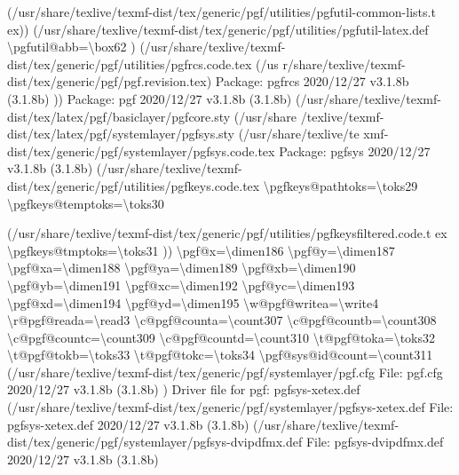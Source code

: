 \documentclass[
  letterpaper,
  DIV=11,
  numbers=noendperiod]{scrartcl}
\newenvironment{Shaded}{\begin{snugshade}}{\end{snugshade}}
\newcommand{\NormalTok}[1]{\textcolor[rgb]{0.00,0.23,0.31}{#1}}
\begin{document}
\begin{Shaded}
\begin{Highlighting}[]
\NormalTok{(/usr/share/texlive/texmf{-}dist/tex/generic/pgf/utilities/pgfutil{-}common{-}lists.t}
\NormalTok{ex)) (/usr/share/texlive/texmf{-}dist/tex/generic/pgf/utilities/pgfutil{-}latex.def}
\NormalTok{\textbackslash{}pgfutil@abb=\textbackslash{}box62}
\NormalTok{) (/usr/share/texlive/texmf{-}dist/tex/generic/pgf/utilities/pgfrcs.code.tex (/us}
\NormalTok{r/share/texlive/texmf{-}dist/tex/generic/pgf/pgf.revision.tex)}
\NormalTok{Package: pgfrcs 2020/12/27 v3.1.8b (3.1.8b)}
\NormalTok{))}
\NormalTok{Package: pgf 2020/12/27 v3.1.8b (3.1.8b)}
\NormalTok{(/usr/share/texlive/texmf{-}dist/tex/latex/pgf/basiclayer/pgfcore.sty (/usr/share}
\NormalTok{/texlive/texmf{-}dist/tex/latex/pgf/systemlayer/pgfsys.sty (/usr/share/texlive/te}
\NormalTok{xmf{-}dist/tex/generic/pgf/systemlayer/pgfsys.code.tex}
\NormalTok{Package: pgfsys 2020/12/27 v3.1.8b (3.1.8b)}
\NormalTok{(/usr/share/texlive/texmf{-}dist/tex/generic/pgf/utilities/pgfkeys.code.tex}
\NormalTok{\textbackslash{}pgfkeys@pathtoks=\textbackslash{}toks29}
\NormalTok{\textbackslash{}pgfkeys@temptoks=\textbackslash{}toks30}

\NormalTok{(/usr/share/texlive/texmf{-}dist/tex/generic/pgf/utilities/pgfkeysfiltered.code.t}
\NormalTok{ex}
\NormalTok{\textbackslash{}pgfkeys@tmptoks=\textbackslash{}toks31}
\NormalTok{))}
\NormalTok{\textbackslash{}pgf@x=\textbackslash{}dimen186}
\NormalTok{\textbackslash{}pgf@y=\textbackslash{}dimen187}
\NormalTok{\textbackslash{}pgf@xa=\textbackslash{}dimen188}
\NormalTok{\textbackslash{}pgf@ya=\textbackslash{}dimen189}
\NormalTok{\textbackslash{}pgf@xb=\textbackslash{}dimen190}
\NormalTok{\textbackslash{}pgf@yb=\textbackslash{}dimen191}
\NormalTok{\textbackslash{}pgf@xc=\textbackslash{}dimen192}
\NormalTok{\textbackslash{}pgf@yc=\textbackslash{}dimen193}
\NormalTok{\textbackslash{}pgf@xd=\textbackslash{}dimen194}
\NormalTok{\textbackslash{}pgf@yd=\textbackslash{}dimen195}
\NormalTok{\textbackslash{}w@pgf@writea=\textbackslash{}write4}
\NormalTok{\textbackslash{}r@pgf@reada=\textbackslash{}read3}
\NormalTok{\textbackslash{}c@pgf@counta=\textbackslash{}count307}
\NormalTok{\textbackslash{}c@pgf@countb=\textbackslash{}count308}
\NormalTok{\textbackslash{}c@pgf@countc=\textbackslash{}count309}
\NormalTok{\textbackslash{}c@pgf@countd=\textbackslash{}count310}
\NormalTok{\textbackslash{}t@pgf@toka=\textbackslash{}toks32}
\NormalTok{\textbackslash{}t@pgf@tokb=\textbackslash{}toks33}
\NormalTok{\textbackslash{}t@pgf@tokc=\textbackslash{}toks34}
\NormalTok{\textbackslash{}pgf@sys@id@count=\textbackslash{}count311}
\NormalTok{(/usr/share/texlive/texmf{-}dist/tex/generic/pgf/systemlayer/pgf.cfg}
\NormalTok{File: pgf.cfg 2020/12/27 v3.1.8b (3.1.8b)}
\NormalTok{)}
\NormalTok{Driver file for pgf: pgfsys{-}xetex.def}
\NormalTok{(/usr/share/texlive/texmf{-}dist/tex/generic/pgf/systemlayer/pgfsys{-}xetex.def}
\NormalTok{File: pgfsys{-}xetex.def 2020/12/27 v3.1.8b (3.1.8b)}
\NormalTok{(/usr/share/texlive/texmf{-}dist/tex/generic/pgf/systemlayer/pgfsys{-}dvipdfmx.def}
\NormalTok{File: pgfsys{-}dvipdfmx.def 2020/12/27 v3.1.8b (3.1.8b)}


\end{Highlighting}
\end{Shaded}
\end{document}

